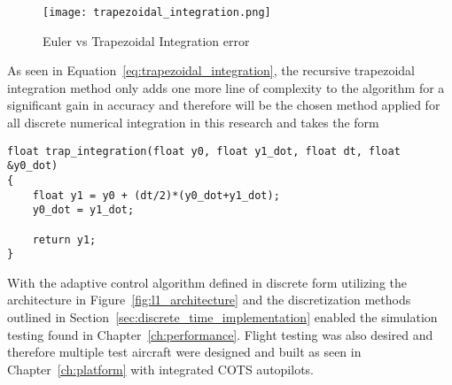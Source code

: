 \begin{figure}[h!]
 \centering
  \texttt{[image: trapezoidal\_integration.png]}
  \caption{Euler vs Trapezoidal Integration error}
  \label{fig:trapezoidal_integration}
\end{figure}

As seen in Equation~\ref{eq:trapezoidal_integration}, the recursive trapezoidal integration method only adds one more line of complexity to the algorithm for a significant gain in accuracy and therefore will be the chosen method applied for all discrete numerical integration in this research and takes the form \newline

\begin{lstlisting}
float trap_integration(float y0, float y1_dot, float dt, float &y0_dot)
{
    float y1 = y0 + (dt/2)*(y0_dot+y1_dot);
    y0_dot = y1_dot;

    return y1;
}
\end{lstlisting}

With the \Lone adaptive control algorithm defined in discrete form utilizing the architecture in Figure~\ref{fig:l1_architecture} and the discretization methods outlined in Section~\ref{sec:discrete_time_implementation} enabled the simulation testing found in Chapter~\ref{ch:performance}.  Flight testing was also desired and therefore multiple test aircraft were designed and built as seen in Chapter~\ref{ch:platform} with integrated \ac{COTS} autopilots.











